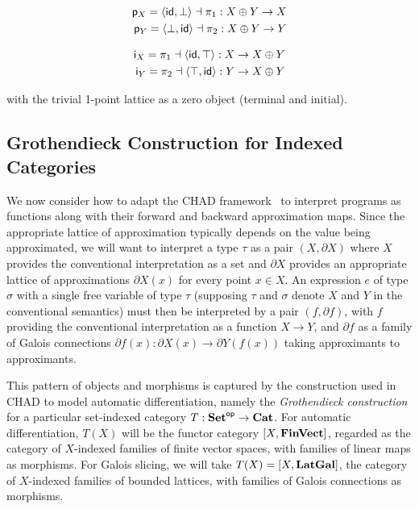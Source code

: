 \vspace{-4mm}
\begin{minipage}[t]{0.45\textwidth}
\begin{center}
\begin{align*}
   \mathsf{p}_X = \langle \mathsf{id}, \bot\rangle \dashv \pi_1: X \oplus Y \to X \\
   \mathsf{p}_Y = \langle \bot, \mathsf{id}\rangle \dashv \pi_2: X \oplus Y \to Y
\end{align*}
\end{center}
\end{minipage}%
\begin{minipage}[t]{0.45\textwidth}
\begin{center}
\begin{align*}
   \mathsf{i}_X = \pi_1 \dashv \langle \mathsf{id}, \top\rangle : X \to X \oplus Y \\
   \mathsf{i}_Y = \pi_2 \dashv \langle \top, \mathsf{id}\rangle: Y \to X \oplus Y
\end{align*}
\end{center}
\end{minipage}
\vspace{2mm}

\noindent with the trivial 1-point lattice as a zero object (terminal and initial).

\subsection{Grothendieck Construction for Indexed Categories}
\label{sec:Grothendieck}

We now consider how to adapt the CHAD framework~\cite{vákár22,nunes2023} to interpret programs as functions
along with their forward and backward approximation maps. Since the appropriate lattice of approximation
typically depends on the value being approximated, we will want to interpret a type $\tau$ as a pair $(X,
\partial X)$ where $X$ provides the conventional interpretation as a set and $\partial X$ provides an
appropriate lattice of approximations $\partial X(x)$ for every point $x \in X$. An expression $e$ of type
$\sigma$ with a single free variable of type $\tau$ (supposing $\tau$ and $\sigma$ denote $X$ and $Y$ in the
conventional semantics) must then be interpreted by a pair $(f, \partial f)$, with $f$ providing the
conventional interpretation as a function $X \to Y$, and $\partial f$ as a family of Galois connections
$\partial f(x): \partial X(x) \to \partial Y(f(x))$ taking approximants to approximants.

This pattern of objects and morphisms is captured by the construction used in CHAD to model automatic
differentiation, namely the \emph{Grothendieck construction} for a particular set-indexed category $T:
\mathbf{Set}^{\mathsf{op}} \to \mathbf{Cat}$. For automatic differentiation, $T(X)$ will be the functor category $[X,\mathbf{FinVect}]$,
regarded as the category of $X$-indexed families of finite vector spaces, with families of linear maps as
morphisms. For Galois slicing, we will take $T(X) = [X,\mathbf{LatGal}]$, the category of $X$-indexed families
of bounded lattices, with families of Galois connections as morphisms.

